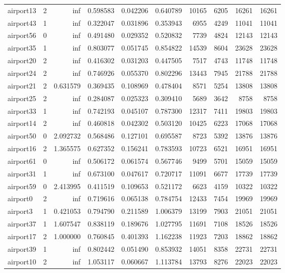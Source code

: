 \begin{longtable}{|l|r|r|r|r|r|r|r|r|r|}
airport13 & 2 & inf & 0.598583 & 0.042206 & 0.640789 & 10165 & 6205 & 16261 & 16261 \\
airport43 & 1 & inf & 0.322047 & 0.031896 & 0.353943 & 6955 & 4249 & 11041 & 11041 \\
airport56 & 0 & inf & 0.491480 & 0.029352 & 0.520832 & 7739 & 4824 & 12143 & 12143 \\
airport35 & 1 & inf & 0.803077 & 0.051745 & 0.854822 & 14539 & 8604 & 23628 & 23628 \\
airport20 & 2 & inf & 0.416302 & 0.031203 & 0.447505 & 7517 & 4743 & 11748 & 11748 \\
airport24 & 2 & inf & 0.746926 & 0.055370 & 0.802296 & 13443 & 7945 & 21788 & 21788 \\
airport21 & 2 & 0.631579 & 0.369435 & 0.108969 & 0.478404 & 8571 & 5254 & 13808 & 13808 \\
airport25 & 2 & inf & 0.284087 & 0.025323 & 0.309410 & 5689 & 3642 & 8758 & 8758 \\
airport33 & 1 & inf & 0.742193 & 0.045107 & 0.787300 & 12317 & 7411 & 19803 & 19803 \\
airport14 & 2 & inf & 0.460818 & 0.042302 & 0.503120 & 10425 & 6223 & 17068 & 17068 \\
airport50 & 0 & 2.092732 & 0.568486 & 0.127101 & 0.695587 & 8723 & 5392 & 13876 & 13876 \\
airport16 & 2 & 1.365575 & 0.627352 & 0.156241 & 0.783593 & 10723 & 6521 & 16951 & 16951 \\
airport61 & 0 & inf & 0.506172 & 0.061574 & 0.567746 & 9499 & 5701 & 15059 & 15059 \\
airport31 & 1 & inf & 0.673100 & 0.047617 & 0.720717 & 11091 & 6677 & 17739 & 17739 \\
airport59 & 0 & 2.413995 & 0.411519 & 0.109653 & 0.521172 & 6623 & 4159 & 10322 & 10322 \\
airport0 & 2 & inf & 0.719616 & 0.065138 & 0.784754 & 12433 & 7454 & 19969 & 19969 \\
airport3 & 1 & 0.421053 & 0.794790 & 0.211589 & 1.006379 & 13199 & 7903 & 21051 & 21051 \\
airport37 & 1 & 1.607547 & 0.838119 & 0.189676 & 1.027795 & 11691 & 7108 & 18526 & 18526 \\
airport17 & 2 & 1.000000 & 0.760845 & 0.401393 & 1.162238 & 11923 & 7203 & 18862 & 18862 \\
airport39 & 1 & inf & 0.802442 & 0.051490 & 0.853932 & 14051 & 8358 & 22731 & 22731 \\
airport10 & 2 & inf & 1.053117 & 0.060667 & 1.113784 & 13793 & 8276 & 22023 & 22023 \\

\end{longtable}
